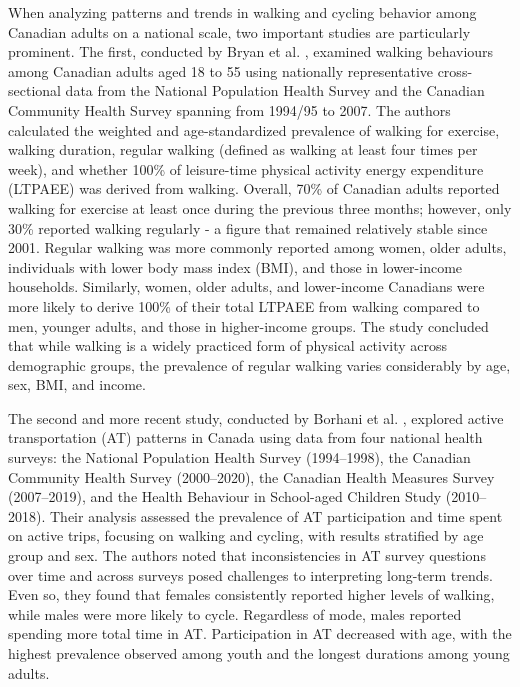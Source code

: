 \documentclass[preprint, 3p,
authoryear]{elsarticle} %
\begin{document}
When analyzing patterns and trends in walking and cycling behavior among
Canadian adults on a national scale, two important studies are
particularly prominent. The first, conducted by Bryan et al.
\citeyearpar{bryan2009}, examined walking behaviours among Canadian
adults aged 18 to 55 using nationally representative cross-sectional
data from the National Population Health Survey and the Canadian
Community Health Survey spanning from 1994/95 to 2007. The authors
calculated the weighted and age-standardized prevalence of walking for
exercise, walking duration, regular walking (defined as walking at least
four times per week), and whether 100\% of leisure-time physical
activity energy expenditure (LTPAEE) was derived from walking. Overall,
70\% of Canadian adults reported walking for exercise at least once
during the previous three months; however, only 30\% reported walking
regularly - a figure that remained relatively stable since 2001. Regular
walking was more commonly reported among women, older adults,
individuals with lower body mass index (BMI), and those in lower-income
households. Similarly, women, older adults, and lower-income Canadians
were more likely to derive 100\% of their total LTPAEE from walking
compared to men, younger adults, and those in higher-income groups. The
study concluded that while walking is a widely practiced form of
physical activity across demographic groups, the prevalence of regular
walking varies considerably by age, sex, BMI, and income.

The second and more recent study, conducted by Borhani et al.
\citeyearpar{borhani2024}, explored active transportation (AT) patterns
in Canada using data from four national health surveys: the National
Population Health Survey (1994--1998), the Canadian Community Health
Survey (2000--2020), the Canadian Health Measures Survey (2007--2019),
and the Health Behaviour in School-aged Children Study (2010--2018).
Their analysis assessed the prevalence of AT participation and time
spent on active trips, focusing on walking and cycling, with results
stratified by age group and sex. The authors noted that inconsistencies
in AT survey questions over time and across surveys posed challenges to
interpreting long-term trends. Even so, they found that females
consistently reported higher levels of walking, while males were more
likely to cycle. Regardless of mode, males reported spending more total
time in AT. Participation in AT decreased with age, with the highest
prevalence observed among youth and the longest durations among young
adults.
\end{document}
